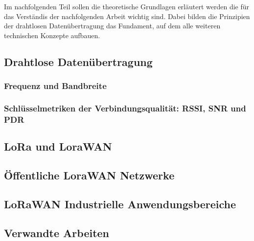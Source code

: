 Im nachfolgenden Teil sollen die theoretische Grundlagen erläutert werden die für das Verständis der nachfolgenden Arbeit wichtig sind. Dabei bilden die Prinzipien der drahtlosen Datenübertragung das Fundament, auf dem alle weiteren technischen Konzepte aufbauen.
\label{kap:grundlagen}
\subsection{Drahtlose Datenübertragung}

\subsubsection*{Frequenz und Bandbreite}

\subsubsection*{Schlüsselmetriken der Verbindungsqualität: RSSI, SNR und PDR}

\subsection{LoRa und LoraWAN}

\subsection{Öffentliche LoraWAN Netzwerke}

\subsection{LoRaWAN Industrielle Anwendungsbereiche}

\subsection{Verwandte Arbeiten}
